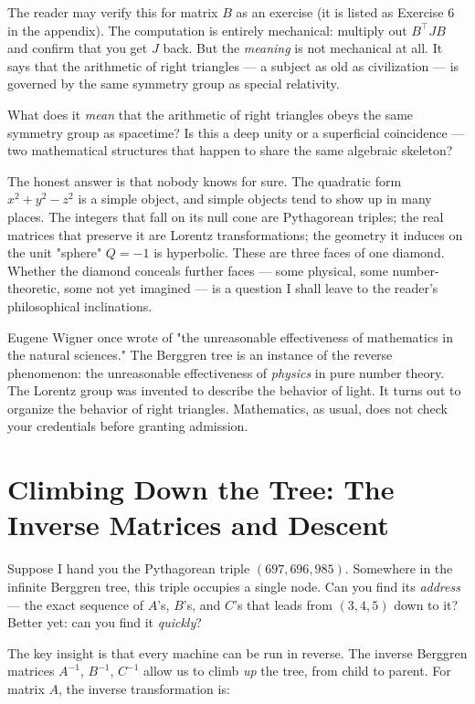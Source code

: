 \documentclass[11pt,twoside,openright]{book}
\theoremstyle{definition}
\theoremstyle{remark}
\begin{document}
The reader may verify this for matrix $B$ as an exercise (it is listed as Exercise 6 in the appendix). The computation is entirely mechanical: multiply out $B^\top J B$ and confirm that you get $J$ back. But the \textit{meaning} is not mechanical at all. It says that the arithmetic of right triangles --- a subject as old as civilization --- is governed by the same symmetry group as special relativity.


What does it \textit{mean} that the arithmetic of right triangles obeys the same symmetry group as spacetime? Is this a deep unity or a superficial coincidence --- two mathematical structures that happen to share the same algebraic skeleton?

The honest answer is that nobody knows for sure. The quadratic form $x^2 + y^2 - z^2$ is a simple object, and simple objects tend to show up in many places. The integers that fall on its null cone are Pythagorean triples; the real matrices that preserve it are Lorentz transformations; the geometry it induces on the unit "sphere" $Q = -1$ is hyperbolic. These are three faces of one diamond. Whether the diamond conceals further faces --- some physical, some number-theoretic, some not yet imagined --- is a question I shall leave to the reader's philosophical inclinations.

Eugene Wigner once wrote of "the unreasonable effectiveness of mathematics in the natural sciences." The Berggren tree is an instance of the reverse phenomenon: the unreasonable effectiveness of \textit{physics} in pure number theory. The Lorentz group was invented to describe the behavior of light. It turns out to organize the behavior of right triangles. Mathematics, as usual, does not check your credentials before granting admission.


\section{Climbing Down the Tree: The Inverse Matrices and Descent}

Suppose I hand you the Pythagorean triple $(697, 696, 985)$. Somewhere in the infinite Berggren tree, this triple occupies a single node. Can you find its \textit{address} --- the exact sequence of $A$'s, $B$'s, and $C$'s that leads from $(3, 4, 5)$ down to it? Better yet: can you find it \textit{quickly}?

The key insight is that every machine can be run in reverse. The inverse Berggren matrices $A^{-1}$, $B^{-1}$, $C^{-1}$ allow us to climb \textit{up} the tree, from child to parent. For matrix $A$, the inverse transformation is:
\end{document}
